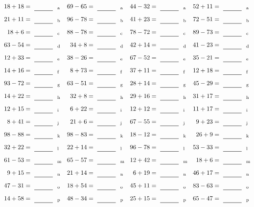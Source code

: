 \documentclass
[
  draft    = true,
  fontsize = 11pt,
  parskip  = half-
]
{scrartcl}
\begin{document}
\clearpage
\begin{align*}
    \pline{18+18}&=\rline{a}
  & \pline{69-65}&=\rline{a}
  & \pline{44-32}&=\rline{a}
  & \pline{52+11}&=\rline{a} \\[1ex]
    \pline{21+11}&=\rline{b}
  & \pline{96-78}&=\rline{b}
  & \pline{41+23}&=\rline{b}
  & \pline{72-51}&=\rline{b} \\[1ex]
    \pline{18+6}&=\rline{c}
  & \pline{88-78}&=\rline{c}
  & \pline{78-72}&=\rline{c}
  & \pline{89-73}&=\rline{c} \\[1ex]
    \pline{63-54}&=\rline{d}
  & \pline{34+8}&=\rline{d}
  & \pline{42+14}&=\rline{d}
  & \pline{41-23}&=\rline{d} \\[1ex]
    \pline{12+33}&=\rline{e}
  & \pline{38-26}&=\rline{e}
  & \pline{67-52}&=\rline{e}
  & \pline{35-21}&=\rline{e} \\[1ex]
    \pline{14+16}&=\rline{f}
  & \pline{8+73}&=\rline{f}
  & \pline{37+11}&=\rline{f}
  & \pline{12+18}&=\rline{f} \\[1ex]
    \pline{93-72}&=\rline{g}
  & \pline{63-51}&=\rline{g}
  & \pline{28+14}&=\rline{g}
  & \pline{45-29}&=\rline{g} \\[1ex]
    \pline{14+22}&=\rline{h}
  & \pline{32+8}&=\rline{h}
  & \pline{29+16}&=\rline{h}
  & \pline{31+17}&=\rline{h} \\[1ex]
    \pline{12+15}&=\rline{i}
  & \pline{6+22}&=\rline{i}
  & \pline{12+12}&=\rline{i}
  & \pline{11+17}&=\rline{i} \\[1ex]
    \pline{8+41}&=\rline{j}
  & \pline{21+6}&=\rline{j}
  & \pline{67-55}&=\rline{j}
  & \pline{9+23}&=\rline{j} \\[1ex]
    \pline{98-88}&=\rline{k}
  & \pline{98-83}&=\rline{k}
  & \pline{18-12}&=\rline{k}
  & \pline{26+9}&=\rline{k} \\[1ex]
    \pline{32+22}&=\rline{l}
  & \pline{22+14}&=\rline{l}
  & \pline{96-78}&=\rline{l}
  & \pline{53-33}&=\rline{l} \\[1ex]
    \pline{61-53}&=\rline{m}
  & \pline{65-57}&=\rline{m}
  & \pline{12+42}&=\rline{m}
  & \pline{18+6}&=\rline{m} \\[1ex]
    \pline{9+15}&=\rline{n}
  & \pline{21+14}&=\rline{n}
  & \pline{6+19}&=\rline{n}
  & \pline{46+17}&=\rline{n} \\[1ex]
    \pline{47-31}&=\rline{o}
  & \pline{18+54}&=\rline{o}
  & \pline{45+11}&=\rline{o}
  & \pline{83-63}&=\rline{o} \\[1ex]
    \pline{14+58}&=\rline{p}
  & \pline{48-34}&=\rline{p}
  & \pline{25+15}&=\rline{p}
  & \pline{65-47}&=\rline{p}
\end{align*}
\end{document}
